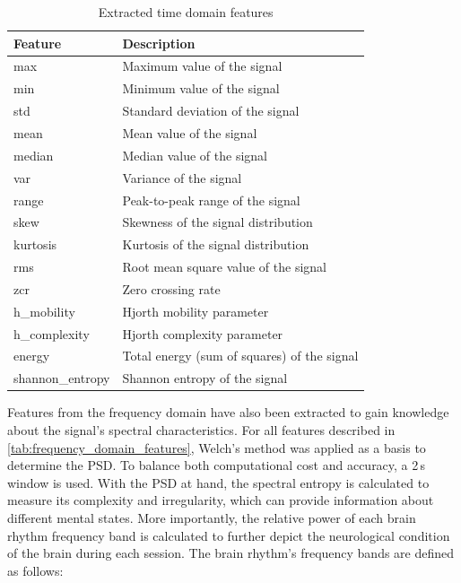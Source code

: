     \begin{table}[h!]
      \centering
      \begin{tabular}{|p{}|p{}|}
        \hline
        \textbf{Feature} & \textbf{Description} \\
        \hline
        max & Maximum value of the signal \\
        \hline
        min & Minimum value of the signal \\
        \hline
        std & Standard deviation of the signal \\
        \hline
        mean & Mean value of the signal \\
        \hline
        median & Median value of the signal \\
        \hline
        var & Variance of the signal \\
        \hline
        range & Peak-to-peak range of the signal \\
        \hline
        skew & Skewness of the signal distribution \\
        \hline
        kurtosis & Kurtosis of the signal distribution \\
        \hline
        rms & Root mean square value of the signal \\
        \hline
        zcr & Zero crossing rate \\
        \hline
        h\_mobility & Hjorth mobility parameter \\
        \hline
        h\_complexity & Hjorth complexity parameter \\
        \hline
        energy & Total energy (sum of squares) of the signal \\
        \hline
        shannon\_entropy & Shannon entropy of the signal \\
        \hline
      \end{tabular}
      \caption{Extracted time domain features}
      \label{tab:time_domain_features}
    \end{table}
    Features from the frequency domain have also been extracted to gain knowledge about the signal's spectral characteristics. For all features described in \autoref{tab:frequency_domain_features}, Welch's method was applied as a basis to determine the \ac{PSD}. To balance both computational cost and accuracy, a 2\,s window is used. With the \ac{PSD} at hand, the spectral entropy is calculated to measure its complexity and irregularity, which can provide information about different mental states. More importantly, the relative power of each brain rhythm frequency band is calculated to further depict the neurological condition of the brain during each session. The brain rhythm's frequency bands are defined as follows:
